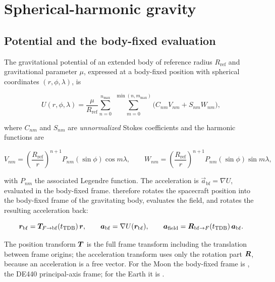 \section{Spherical-harmonic gravity}
\label{sec:dyn-harmonics}

\subsection{Potential and the body-fixed evaluation}

The gravitational potential of an extended body of reference radius
$R_\mathrm{ref}$ and gravitational parameter $\mu$, expressed at a body-fixed
position with spherical coordinates $(r,\phi,\lambda)$, is

\begin{equation}
  \label{eq:dyn-potential}
  U(r,\phi,\lambda) =
  \frac{\mu}{R_\mathrm{ref}}
  \sum_{n=0}^{n_\mathrm{max}}\ \sum_{m=0}^{\min(n,m_\mathrm{max})}
  \bigl(C_{nm} V_{nm} + S_{nm} W_{nm}\bigr),
\end{equation}

where $C_{nm}$ and $S_{nm}$ are \emph{unnormalized} Stokes coefficients and the
harmonic functions are

\begin{equation}
  \label{eq:dyn-vw-def}
  V_{nm} = \left(\frac{R_\mathrm{ref}}{r}\right)^{\!n+1} P_{nm}(\sin\phi)\cos m\lambda,
  \qquad
  W_{nm} = \left(\frac{R_\mathrm{ref}}{r}\right)^{\!n+1} P_{nm}(\sin\phi)\sin m\lambda,
\end{equation}

with $P_{nm}$ the associated Legendre function. The acceleration is
$\vec{a}_\mathrm{bf} = \nabla U$, evaluated in the body-fixed frame. \lupnt{}
therefore rotates the spacecraft position into the body-fixed frame of the
gravitating body, evaluates the field, and rotates the resulting acceleration
back:

\begin{equation}
  \label{eq:dyn-bf-rot}
  \bm{r}_\mathrm{bf} = \bm{T}_{F\rightarrow \mathrm{bf}}(t_{\mathrm{TDB}})\,\bm{r},
  \qquad
  \bm{a}_\mathrm{bf} = \nabla U(\bm{r}_\mathrm{bf}),
  \qquad
  \bm{a}_{\mathrm{field}} = \bm{R}_{\mathrm{bf}\rightarrow F}(t_{\mathrm{TDB}})\,\bm{a}_\mathrm{bf}.
\end{equation}

The position transform $\bm{T}$ is the full frame transform including the
translation between frame origins; the acceleration transform uses only the
rotation part $\bm{R}$, because an acceleration is a free vector. For the Moon
the body-fixed frame is , the DE440 principal-axis frame; for the
Earth it is .

